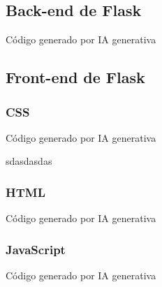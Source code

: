\documentclass{../../../miPlantilla}
\begin{document}
\subsection{Back-end de Flask}
\label{anexo:flask-backend}
{\tiny*Código generado por IA generativa}

\subsection{Front-end de Flask}
\label{anexo:flask-frontend}
\subsubsection*{CSS}
{\tiny*Código generado por IA generativa}

sdasdasdas

\subsubsection*{HTML}
{\tiny*Código generado por IA generativa}

\subsubsection*{JavaScript}
{\tiny*Código generado por IA generativa}
\end{document}
